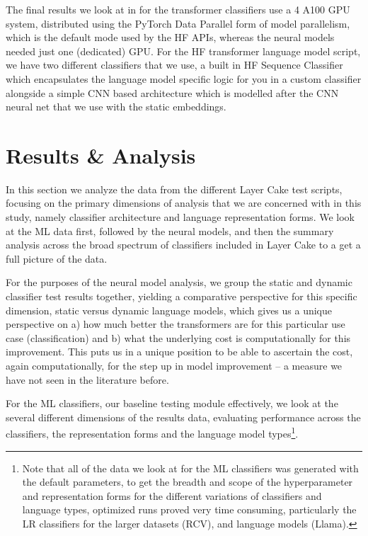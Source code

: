 \documentclass[final]{clv2025}
\begin{document}
The final results we look at in for the transformer classifiers use a 4 A100 GPU system, distributed using the PyTorch Data Parallel form of model parallelism, which is the default mode used by the HF APIs, whereas the neural models needed just one (dedicated) GPU. For the HF transformer language model script, we have two different classifiers that we use, a built in HF Sequence Classifier which encapsulates the language model specific logic for you in a custom classifier alongside a simple CNN based architecture which is modelled after the CNN neural net that we use with the static embeddings.

\section{Results \& Analysis}
In this section we analyze the data from the different Layer Cake test scripts, focusing on the primary dimensions of analysis that we are concerned with in this study, namely classifier architecture and language representation forms. We look at the ML data first, followed by the neural models, and then the summary analysis across the broad spectrum of classifiers included in Layer Cake to a get a full picture of the data. 

For the purposes of the neural model analysis, we group the static and dynamic classifier test results together, yielding a comparative perspective for this specific dimension, static versus dynamic language models, which gives us a unique perspective on a) how much better the transformers are for this particular use case (classification) and b) what the underlying cost is computationally for this improvement. This puts us in a unique position to be able to ascertain the cost, again computationally, for the step up in model improvement – a measure we have not seen in the literature before.

For the ML classifiers, our baseline testing module effectively, we look at the several different dimensions of the results data, evaluating performance across the classifiers, the representation forms and the language model types\footnote{  Note that all of the data we look at for the ML classifiers was generated with the default parameters, to get the breadth and scope of the hyperparameter and representation forms for the different variations of classifiers and language types, optimized runs proved very time consuming, particularly the LR classifiers for the larger datasets (RCV), and language models (Llama).}. 
\end{document}
